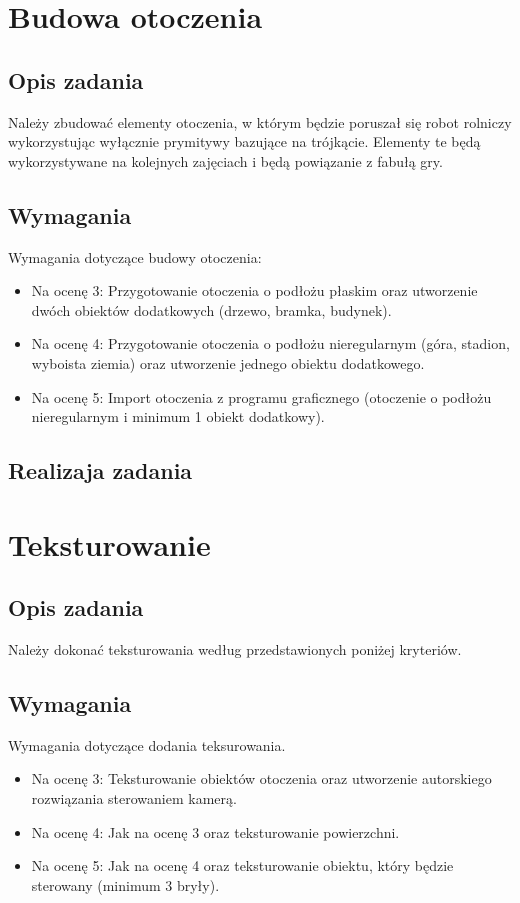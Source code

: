\documentclass[a4paper, 12pt]{report}
\begin{document}
\chapter{Budowa otoczenia}
\section{Opis zadania}
Należy zbudować elementy otoczenia, w którym będzie poruszał się robot rolniczy wykorzystując wyłącznie prymitywy bazujące na trójkącie. Elementy te będą wykorzystywane na kolejnych zajęciach i będą powiązanie z fabułą gry.
\section{Wymagania}
Wymagania dotyczące budowy otoczenia:
\begin{itemize}
\item Na ocenę 3: Przygotowanie otoczenia o podłożu płaskim oraz utworzenie dwóch obiektów dodatkowych (drzewo, bramka, budynek).
\item Na ocenę 4: Przygotowanie otoczenia o podłożu nieregularnym (góra, stadion, wyboista ziemia) oraz utworzenie jednego obiektu dodatkowego.
\item Na ocenę 5: Import otoczenia z programu graficznego (otoczenie o podłożu nieregularnym i minimum 1 obiekt dodatkowy).
\end{itemize}

\section{Realizaja zadania}

\chapter{Teksturowanie}
\section{Opis zadania}

Należy dokonać teksturowania według przedstawionych poniżej kryteriów.
\section{Wymagania}

Wymagania dotyczące dodania teksurowania.
\begin{itemize}
\item Na ocenę 3: Teksturowanie obiektów otoczenia oraz utworzenie autorskiego rozwiązania sterowaniem kamerą.
\item Na ocenę 4: Jak na ocenę 3 oraz teksturowanie powierzchni.
\item Na ocenę 5: Jak na ocenę 4 oraz teksturowanie obiektu, który będzie sterowany (minimum 3 bryły).
\end{itemize}
\end{document}
